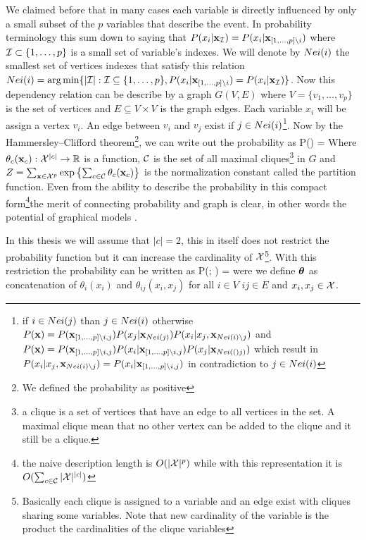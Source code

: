 We claimed before that in many cases each variable is directly influenced by only a small subset of the $p$ variables that describe the event.
In probability terminology this sum down to saying that $P(x_i |{\bf x}_{{\cal I}}) = P(x_i|{\bf x}_{[1,\ldots,p] \setminus i})$ where ${\cal I} \subset \{1,\ldots,p\}$  is a small set of variable's indexes.
We will denote by $Nei(i)$ the smallest set of vertices indexes that satisfy this relation $Nei(i) = \arg\min \{|{\cal I}| : {\cal I} \subseteq \{1,\ldots,p\}, P(x_i|{\bf x}_{[1,\ldots,p] \setminus i}) = P(x_i |{\bf x}_{{\cal I}}) \}$.
Now this dependency relation can be describe by a graph $G(V,E)$ where $V = \{v_1,\ldots, v_p\}$ is the set of vertices and  $E \subseteq V \times V$ is the graph edges.
Each variable $x_i$ will be assign a vertex $v_i$. 
An edge between $v_i$ and $v_j$ exist if  $j \in Nei(i)$\footnote{if $i \in Nei(j)$ than $j \in Nei(i)$ otherwise $P({\bf x}) = P({\bf x}_{[1,\ldots,p]\setminus i,j}) P(x_j|{\bf x}_{Nei(j)}) P(x_i|x_j,{\bf x}_{Nei(i)\setminus j})$ and $P({\bf x}) = P({\bf x}_{[1,\ldots,p]\setminus i,j}) P(x_i|{\bf x}_{[1,\ldots,p]\setminus i,j}) P(x_j|{\bf x}_{Nei(()j)})$ which result in $P(x_i|x_j,{\bf x}_{Nei(i)\setminus j}) =   P(x_i|{\bf x}_{[1,\ldots,p]\setminus i,j})$ in contradiction to $j \in Nei(i)$}.
Now by the Hammersley–Clifford theorem\cite{hammersley1971markov}\footnote{We defined the probability as positive}, we can write out the probability as
\be
P(\xx) =  
\ee
Where $\theta_{c}({\bf x}_{c}): {\cal X}^{|c|} \to \mathbb{R}$  is a function, ${\cal C}$ is the set of all maximal cliques\footnote{a clique is a set of vertices that have an edge to all vertices in the set. A maximal clique mean that no other vertex can be added to the clique and it still be a clique.} in $G$ and $Z = \sum_{{\bf x} \in {\cal X}^p} {\mathrm{exp}}\left\{\sum_{c \in {\cal C}}\theta_{c}({\bf x}_{c})\right\}$ is the normalization constant called the partition function.
Even from the ability to describe the probability in this compact form\footnote{the naive description length is $O(|{\cal X}|^p)$ while with this representation it is $O(\sum_{c \in {\cal C}} |{\cal X}|^{|c|})$}the merit of connecting probability and graph is clear, in other words the potential of graphical models \cite{koller2009probabilistic}.


In this thesis we will assume that $|c| = 2$, this in itself does not restrict the probability function but it can increase the cardinality of ${\cal X}$\footnote{Basically each clique is assigned to a variable and an edge exist with cliques sharing some variables. Note that new cardinality of the variable is the product the cardinalities of the clique variables }.
With this restriction the probability can be written as
\be
\label{eq:basic_model}
P(\xx; \thetav) =  
\ee
were we define $\boldsymbol{\theta}$ as concatenation of $\theta_i(x_i)$ and $\theta_{ij}(x_i,x_j)$ for all $i \in V$ $ij \in E$ and $x_i,x_j \in {\cal X}$.

